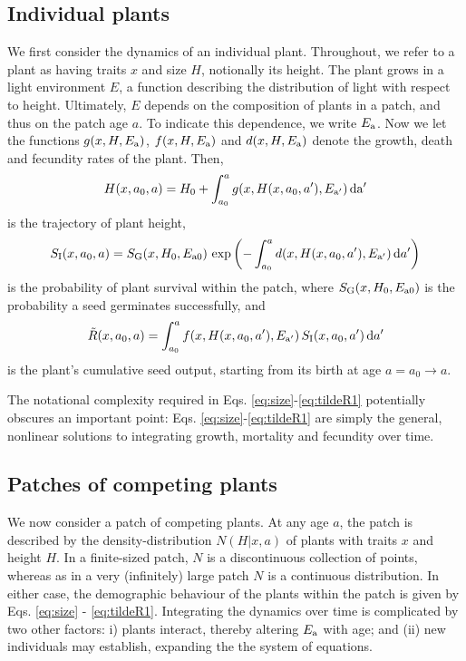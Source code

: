 \documentclass[10pt,twoside]{article}
\begin{document}
\subsection{Individual plants}\label{individual-plants}

We first consider the dynamics of an individual plant. Throughout, we refer to a
plant as having traits \(x\) and size \(H\), notionally its height. The
plant grows in a light environment \(E\), a function describing the distribution
of light with respect to height. Ultimately, \(E\) depends on the
composition of plants in a patch, and thus on the patch age \(a\). To indicate this dependence, we
write \(E_{\rm a}\). Now we let the functions \(g(x, H, E_{\rm a})\), \(f(x, H, E_{\rm a})\) and
\(d(x, H, E_{\rm a})\) denote the growth, death and fecundity rates of the
plant. Then,
\begin{equation} \label{eq:size}
  H(x, a_0, a) = H_0 + \int_{a_0}^{a} g(x, H(x, a_0, a^\prime), E_{\rm a^\prime}) \, \rm{d}a^\prime
\end{equation}
is the trajectory of plant height,
\begin{equation} \label{eq:survivalIndividual}
  S_{\rm I} (x, a_0, a) = S_{\rm G} (x, H_0, E_{{\rm a}0}) \, \exp\left(- \int_{a_0}^{a} d(x, H(x, a_0, a^\prime), E_{\rm a^\prime}) \, {\rm d} a^\prime \right)
\end{equation}
is the probability of plant survival within the patch, where \(S_{\rm G} (x, H_0, E_{{\rm a}0})\)
is the probability a seed germinates successfully, and
\begin{equation} \label{eq:tildeR1}
  \tilde{R}(x, a_0, a) = \int_{a_0}^{a} f(x, H(x, a_0, a^\prime), E_{\rm a^\prime}) \, S_{\rm I} (x, a_0, a^\prime) \, {\rm d} a^\prime
\end{equation}
is the plant's cumulative seed output, starting from its birth at age
\(a = a_0 \rightarrow a\).

The notational complexity required in Eqs. \ref{eq:size}-\ref{eq:tildeR1} potentially obscures an important point: Eqs.
\ref{eq:size}-\ref{eq:tildeR1} are simply the general, nonlinear solutions to
integrating growth, mortality and fecundity over time.

\subsection{Patches of competing plants}\label{patches-of-competing-plants-size-structured-populations}

We now consider a patch of competing plants. At any age \(a\), the
patch is described by the density-distribution \(N(H | x, a)\) of plants
with traits \(x\) and height \(H\). In a finite-sized patch, \(N\) is a
discontinuous collection of points, whereas as in a very (infinitely) large patch
\(N\) is a continuous distribution. In either case, the demographic
behaviour of the plants within the patch is given by Eqs. \ref{eq:size}
- \ref{eq:tildeR1}. Integrating the dynamics over time is complicated by
two other factors: i) plants interact, thereby altering \(E_{\rm a}\) with
age; and (ii) new individuals may establish, expanding the the system of
equations.
\end{document}
